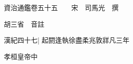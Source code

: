 






























































資治通鑑卷五十五　　宋　司馬光　撰

胡三省　音註

漢紀四十七|{
	起閼逢執徐盡柔兆敦牂凡三年}


孝桓皇帝中

